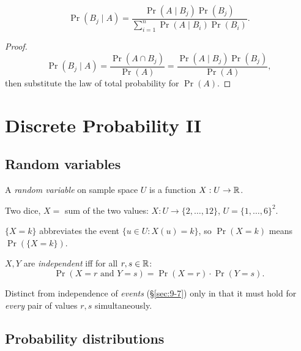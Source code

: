 \documentclass[11pt]{article}
\begin{document}
\begin{theorem}
\[
\Pr(B_j\mid A) = \frac{\Pr(A\mid B_j)\Pr(B_j)}{\sum_{i=1}^n \Pr(A\mid B_i)\Pr(B_i)}.
\]
\end{theorem}
\begin{proof}
\[
\Pr(B_j\mid A) = \frac{\Pr(A\cap B_j)}{\Pr(A)} = \frac{\Pr(A\mid B_j)\Pr(B_j)}{\Pr(A)},
\]
then substitute the law of total probability for $\Pr(A)$.
\end{proof}

\newpage
\section{Discrete Probability II}

\subsection{Random variables}
\label{sec:10-1}

\begin{definition}
A \emph{random variable} on sample space $U$ is a function $X:U\to\mathbb{R}$.
\end{definition}

\begin{example}
Two dice, $X=$ sum of the two values: $X:U\to\{2,\dots,12\}$, $U=\{1,\dots,6\}^2$.
\end{example}

\begin{note}[Notation]
$\{X=k\}$ abbreviates the event $\{u\in U : X(u)=k\}$, so $\Pr(X=k)$ means $\Pr(\{X=k\})$.
\end{note}

\bigskip
\begin{definition}
$X,Y$ are \emph{independent} iff for all $r,s\in\mathbb{R}$:
\[
\Pr(X=r \text{ and } Y=s) = \Pr(X=r)\cdot\Pr(Y=s).
\]
\end{definition}

\begin{note}
Distinct from independence of \emph{events} (\S\ref{sec:9-7}) only in that it must hold for \emph{every} pair of values $r,s$ simultaneously.
\end{note}

\subsection{Probability distributions}
\label{sec:10-2}
\end{document}
